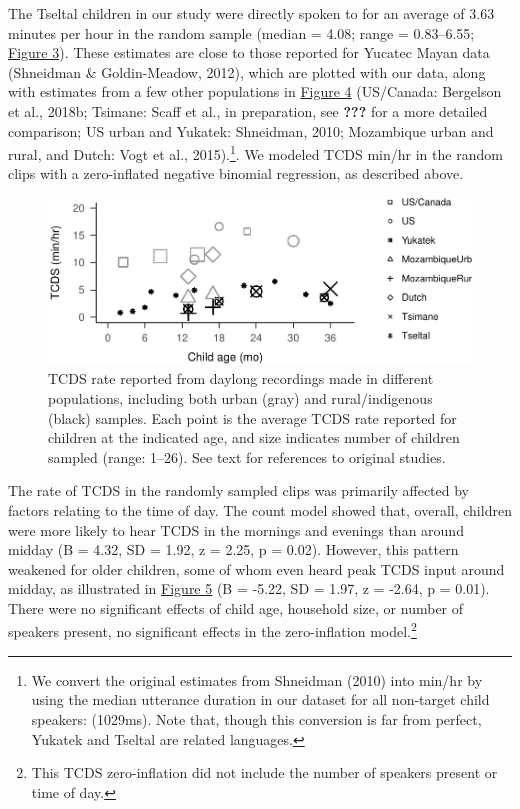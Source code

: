 \documentclass[floatsintext,man]{apa6}
\theoremstyle{definition}
\theoremstyle{definition}
\theoremstyle{definition}
\theoremstyle{remark}
\begin{document}
The Tseltal children in our study were directly spoken to for an average
of 3.63 minutes per hour in the random sample (median = 4.08; range =
0.83--6.55; \protect\hyperlink{fig3}{Figure 3}). These estimates are
close to those reported for Yucatec Mayan data (Shneidman \&
Goldin-Meadow, 2012), which are plotted with our data, along with
estimates from a few other populations in
\protect\hyperlink{fig4}{Figure 4} (US/Canada: Bergelson et al., 2018b;
Tsimane: Scaff et al., in preparation, see {\textbf{???}} for a more
detailed comparison; US urban and Yukatek: Shneidman, 2010; Mozambique
urban and rural, and Dutch: Vogt et al., 2015).\footnote{We convert the
  original estimates from Shneidman (2010) into min/hr by using the
  median utterance duration in our dataset for all non-target child
  speakers: (1029ms). Note that, though this conversion is far from
  perfect, Yukatek and Tseltal are related languages.}. We modeled TCDS
min/hr in the random clips with a zero-inflated negative binomial
regression, as described above.

\begin{figure}
\centering
\includegraphics{Tseltal-CLE_files/figure-latex/fig4-1.pdf}
\caption{\label{fig:fig4}TCDS rate reported from daylong recordings made in
different populations, including both urban (gray) and rural/indigenous
(black) samples. Each point is the average TCDS rate reported for
children at the indicated age, and size indicates number of children
sampled (range: 1--26). See text for references to original studies.}
\end{figure}

The rate of TCDS in the randomly sampled clips was primarily affected by
factors relating to the time of day. The count model showed that,
overall, children were more likely to hear TCDS in the mornings and
evenings than around midday (B = 4.32, SD = 1.92, z = 2.25, p = 0.02).
However, this pattern weakened for older children, some of whom even
heard peak TCDS input around midday, as illustrated in
\protect\hyperlink{fig5}{Figure 5} (B = -5.22, SD = 1.97, z = -2.64, p =
0.01). There were no significant effects of child age, household size,
or number of speakers present, no significant effects in the
zero-inflation model.\footnote{This TCDS zero-inflation did not include
  the number of speakers present or time of day.}
\end{document}
